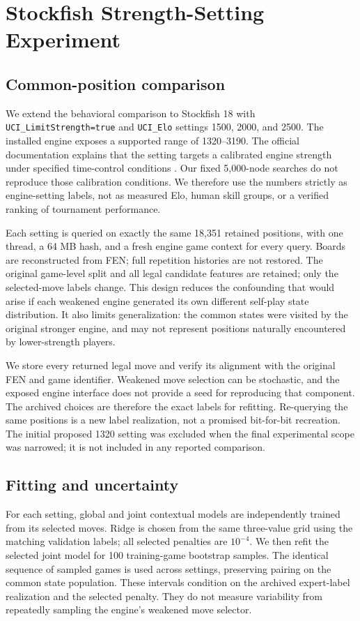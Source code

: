 \section{Stockfish Strength-Setting Experiment}
\subsection{Common-position comparison}
We extend the behavioral comparison to Stockfish 18 with \texttt{UCI\_LimitStrength=true} and \texttt{UCI\_Elo} settings 1500, 2000, and 2500. The installed engine exposes a supported range of 1320--3190. The official documentation explains that the setting targets a calibrated engine strength under specified time-control conditions \cite{stockfishuci}. Our fixed 5,000-node searches do not reproduce those calibration conditions. We therefore use the numbers strictly as engine-setting labels, not as measured Elo, human skill groups, or a verified ranking of tournament performance.

Each setting is queried on exactly the same 18,351 retained positions, with one thread, a 64 MB hash, and a fresh engine game context for every query. Boards are reconstructed from FEN; full repetition histories are not restored. The original game-level split and all legal candidate features are retained; only the selected-move labels change. This design reduces the confounding that would arise if each weakened engine generated its own different self-play state distribution. It also limits generalization: the common states were visited by the original stronger engine, and may not represent positions naturally encountered by lower-strength players.

We store every returned legal move and verify its alignment with the original FEN and game identifier. Weakened move selection can be stochastic, and the exposed engine interface does not provide a seed for reproducing that component. The archived choices are therefore the exact labels for refitting. Re-querying the same positions is a new label realization, not a promised bit-for-bit recreation. The initial proposed 1320 setting was excluded when the final experimental scope was narrowed; it is not included in any reported comparison.

\subsection{Fitting and uncertainty}
For each setting, global and joint contextual models are independently trained from its selected moves. Ridge is chosen from the same three-value grid using the matching validation labels; all selected penalties are $10^{-4}$. We then refit the selected joint model for 100 training-game bootstrap samples. The identical sequence of sampled games is used across settings, preserving pairing on the common state population. These intervals condition on the archived expert-label realization and the selected penalty. They do not measure variability from repeatedly sampling the engine's weakened move selector.

